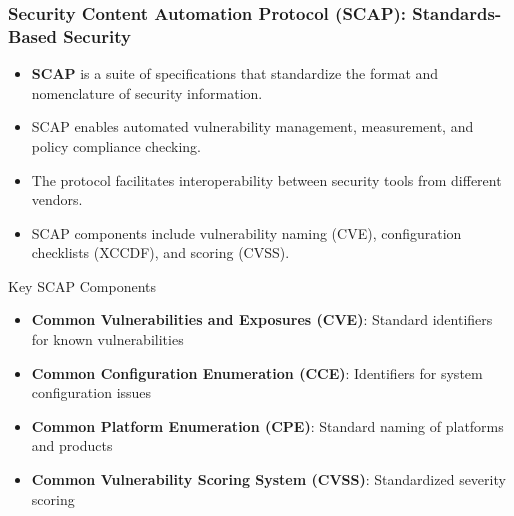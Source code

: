 \documentclass{beamer}
\begin{document}
    \begin{frame}
    \frametitle{Security Content Automation Protocol (SCAP): Standards-Based Security}
    \begin{itemize}
    \item \textbf{SCAP} is a suite of specifications that standardize the format and nomenclature of security information.
    \item SCAP enables automated vulnerability management, measurement, and policy compliance checking.
    \item The protocol facilitates interoperability between security tools from different vendors.
    \item SCAP components include vulnerability naming (CVE), configuration checklists (XCCDF), and scoring (CVSS).
    \end{itemize}
    
    \begin{alertblock}{Key SCAP Components}
    \scriptsize
    \begin{itemize}
    \item \textbf{Common Vulnerabilities and Exposures (CVE)}: Standard identifiers for known vulnerabilities
    \item \textbf{Common Configuration Enumeration (CCE)}: Identifiers for system configuration issues
    \item \textbf{Common Platform Enumeration (CPE)}: Standard naming of platforms and products
    \item \textbf{Common Vulnerability Scoring System (CVSS)}: Standardized severity scoring
    \end{itemize}
    \end{alertblock}
    \end{frame}
    
\end{document}

